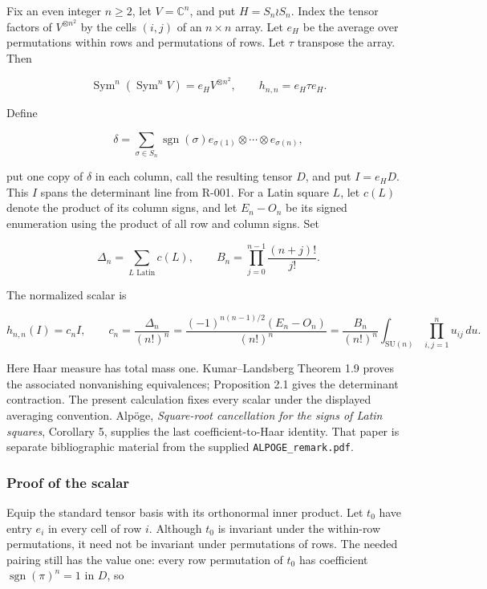\documentclass[
  10pt,
]{article}
\begin{document}
Fix an even integer \(n\ge2\), let \(V=\mathbb C^n\), and put
\(H=S_n\wr S_n\). Index the tensor factors of \(V^{\otimes n^2}\) by the
cells \((i,j)\) of an \(n\times n\) array. Let \(e_H\) be the average
over permutations within rows and permutations of rows. Let \(\tau\)
transpose the array. Then

\[
\operatorname{Sym}^n(\operatorname{Sym}^nV)=e_HV^{\otimes n^2},
\qquad h_{n,n}=e_H\tau e_H.
\]

Define

\[
\delta=\sum_{\sigma\in S_n}\operatorname{sgn}(\sigma)
e_{\sigma(1)}\otimes\cdots\otimes e_{\sigma(n)},
\]

put one copy of \(\delta\) in each column, call the resulting tensor
\(D\), and put \(I=e_HD\). This \(I\) spans the determinant line from
R-001. For a Latin square \(L\), let \(c(L)\) denote the product of its
column signs, and let \(E_n-O_n\) be its signed enumeration using the
product of all row and column signs. Set

\[
\Delta_n=\sum_{L\text{ Latin}}c(L),\qquad
B_n=\prod_{j=0}^{n-1}\frac{(n+j)!}{j!}.
\]

The normalized scalar is

\[
\boxed{
h_{n,n}(I)=c_n I,\qquad
c_n=\frac{\Delta_n}{(n!)^n}
=\frac{(-1)^{n(n-1)/2}(E_n-O_n)}{(n!)^n}
=\frac{B_n}{(n!)^n}\int_{\mathrm{SU}(n)}\prod_{i,j=1}^n u_{ij}\,du.
}
\tag{R-002}
\]

Here Haar measure has total mass one. Kumar--Landsberg Theorem 1.9
proves the associated nonvanishing equivalences; Proposition 2.1 gives
the determinant contraction. The present calculation fixes every scalar
under the displayed averaging convention. Alpöge, \emph{Square-root
cancellation for the signs of Latin squares}, Corollary 5, supplies the
last coefficient-to-Haar identity. That paper is separate bibliographic
material from the supplied
\texttt{\small ALPOGE\_\allowbreak{}remark.pdf}.

\subsubsection{Proof of the scalar}\label{proof-of-the-scalar}

Equip the standard tensor basis with its orthonormal inner product. Let
\(t_0\) have entry \(e_i\) in every cell of row \(i\). Although \(t_0\)
is invariant under the within-row permutations, it need not be invariant
under permutations of rows. The needed pairing still has the value one:
every row permutation of \(t_0\) has coefficient
\(\operatorname{sgn}(\pi)^n=1\) in \(D\), so
\end{document}

